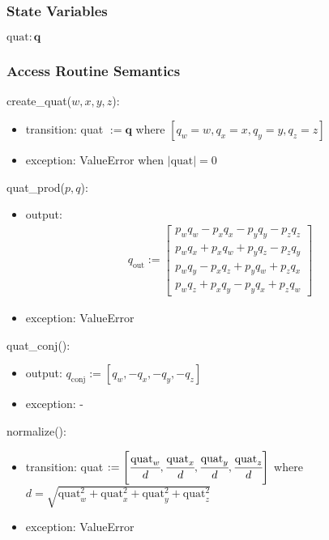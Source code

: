 \documentclass[12pt, titlepage]{article}
\begin{document}
\subsubsection{State Variables}

$\text{quat}: \mathbf{q}$

\subsubsection{Access Routine Semantics}

\noindent create\_quat($w, x, y, z$):
\begin{itemize}
\item transition: quat $:= \mathbf{q}$ where $[q_w = w, q_x = x, q_y = y, q_z = z]$
\item exception: ValueError when $|\text{quat}| = 0$
\end{itemize}

\noindent quat\_prod($p, q$):
\begin{itemize}
\item output:
  \begin{align*}
    q_\text{out} :=  \begin{bmatrix}
      p_w q_w - p_x q_x - p_y q_y - p_z q_z \\
      p_w q_x + p_x q_w + p_y q_z - p_z q_y \\
      p_w q_y - p_x q_z + p_y q_w + p_z q_x \\
      p_w q_z + p_x q_y - p_y q_x + p_z q_w
  \end{bmatrix}
  \end{align*}

\item exception: ValueError
\end{itemize}

\noindent quat\_conj():
\begin{itemize}
\item output: $q_\text{conj} :=  [q_w, -q_x, -q_y, -q_z]$
\item exception: -
\end{itemize}

\noindent normalize():
\begin{itemize}
\item transition: quat $:= \left[ \cfrac{\text{quat}_w}{d}, \cfrac{\text{quat}_x}{d},
\cfrac{\text{quat}_y}{d}, \cfrac{\text{quat}_z}{d} \right]$ where $d = \sqrt{\text{quat}_w^2 +
\text{quat}_x^2 + \text{quat}_y^2 + \text{quat}_z^2}$
\item exception: ValueError
\end{itemize}
\end{document}
